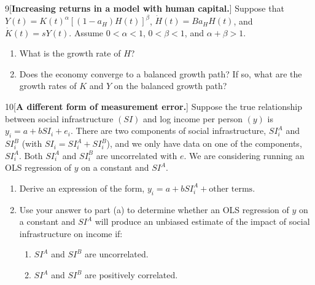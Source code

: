 \begin{problem}{9}[\textbf{Increasing returns in a model with human capital.}]
Suppose that \(Y\left(t\right)=K\left(t\right)^\alpha\left[\left(1-a_H\right)H\left(t\right)\right]^\beta\), \(\dot{H}\left(t\right)=Ba_HH\left(t\right)\), and \(\dot{K}\left(t\right)=sY\left(t\right)\). Assume \(0<\alpha<1\), \(0<\beta<1\), and \(\alpha+\beta>1\).
\begin{enumerate}[label=(\alph*)]
    \item What is the growth rate of \(H\)?
    \item Does the economy converge to a balanced growth path? If so, what are the growth rates of \(K\) and \(Y\) on the balanced growth path?
\end{enumerate}
\end{problem}

\begin{problem}{10}[\textbf{A different form of measurement error.}]
Suppose the true relationship between social infrastructure \(\left(SI\right)\) and log income per person \(\left(y\right)\) is \(y_i=a+bSI_i+e_i\). There are two components of social infrastructure, \(SI_i^A\) and \(SI_i^B\) (with \(SI_i=SI_i^A+SI_i^B\)), and we only have data on one of the components, \(SI_i^A\). Both \(SI_i^A\) and \(SI_i^B\) are uncorrelated with \(e\). We are considering running an OLS regression of \(y\) on a constant and \(SI^A\).
\begin{enumerate}[label=(\alph*)]
    \item Derive an expression of the form, \(y_i=a+bSI_i^A+\text{other terms}\).
    \item Use your answer to part (a) to determine whether an OLS regression of \(y\) on a constant and \(SI^A\) will produce an unbiased estimate of the impact of social infrastructure on income if:
    \begin{enumerate}[label=(\roman*)]
        \item \(SI^A\) and \(SI^B\) are uncorrelated.
        \item \(SI^A\) and \(SI^B\) are positively correlated.
    \end{enumerate}
\end{enumerate}
\end{problem}

